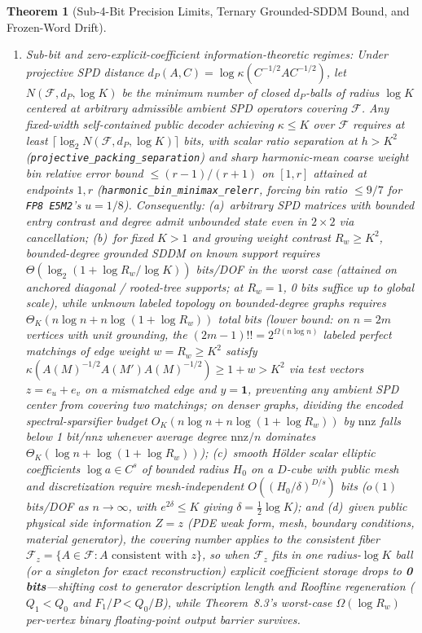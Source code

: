 \documentclass[10pt]{article}
\newtheorem{theorem}{Theorem}
\begin{document}
\begin{theorem}[Sub-4-Bit Precision Limits, Ternary Grounded-SDDM Bound, and Frozen-Word Drift]
\begin{enumerate}
  \item \emph{Sub-bit and zero-explicit-coefficient information-theoretic regimes:} Under projective SPD distance $d_P(A, C) = \log\kappa(C^{-1/2} A C^{-1/2})$, let $N(\mathcal{F}, d_P, \log K)$ be the minimum number of closed $d_P$-balls of radius $\log K$ centered at arbitrary admissible ambient SPD operators covering $\mathcal{F}$. Any fixed-width self-contained public decoder achieving $\kappa \le K$ over $\mathcal{F}$ requires at least $\lceil\log_2 N(\mathcal{F}, d_P, \log K)\rceil$ bits, with scalar ratio separation at $h > K^2$ (\texttt{projective\_packing\_separation}) and sharp harmonic-mean coarse weight bin relative error bound $\le (r - 1)/(r + 1)$ on $[1, r]$ attained at endpoints $1, r$ (\texttt{harmonic\_bin\_minimax\_relerr}, forcing bin ratio $\le 9/7$ for \texttt{FP8 E5M2}'s $u = 1/8$). Consequently: (a)~arbitrary SPD matrices with bounded entry contrast and degree admit \emph{unbounded} state even in $2\times 2$ via cancellation; (b)~for fixed $K > 1$ and growing weight contrast $R_w \ge K^2$, bounded-degree grounded SDDM on known support requires $\Theta(\log_2(1 + \log R_w / \log K))$ bits/DOF in the worst case (attained on anchored diagonal / rooted-tree supports; at $R_w = 1$, 0 bits suffice up to global scale), while unknown labeled topology on bounded-degree graphs requires $\Theta_K(n \log n + n \log(1 + \log R_w))$ total bits (lower bound: on $n = 2m$ vertices with unit grounding, the $(2m-1)!! = 2^{\Omega(n\log n)}$ labeled perfect matchings of edge weight $w = R_w \ge K^2$ satisfy $\kappa(A(M)^{-1/2} A(M') A(M)^{-1/2}) \ge 1 + w > K^2$ via test vectors $z = e_u + e_v$ on a mismatched edge and $y = \mathbf{1}$, preventing any ambient SPD center from covering two matchings; on denser graphs, dividing the encoded spectral-sparsifier budget $O_K(n\log n + n\log(1 + \log R_w))$ by $\mathrm{nnz}$ falls below 1 bit/nnz whenever average degree $\mathrm{nnz}/n$ dominates $\Theta_K(\log n + \log(1 + \log R_w))$); (c)~smooth H\"older scalar elliptic coefficients $\log a \in C^s$ of bounded radius $H_0$ on a $D$-cube with public mesh and discretization require mesh-independent $O((H_0/\delta)^{D/s})$ bits ($o(1)$ bits/DOF as $n \to \infty$, with $e^{2\delta} \le K$ giving $\delta = \frac{1}{2}\log K$); and (d)~given public physical side information $Z = z$ (PDE weak form, mesh, boundary conditions, material generator), the covering number applies to the consistent fiber $\mathcal{F}_z = \{A \in \mathcal{F} : A \text{ consistent with } z\}$, so when $\mathcal{F}_z$ fits in one radius-$\log K$ ball (or a singleton for exact reconstruction) explicit coefficient storage drops to \textbf{0 bits}---shifting cost to generator description length and Roofline regeneration ($Q_1 < Q_0$ and $F_1/P < Q_0/B$), while Theorem~8.3's worst-case $\Omega(\log R_w)$ per-vertex binary floating-point output barrier survives.

\end{enumerate}
\end{theorem}
\end{document}
